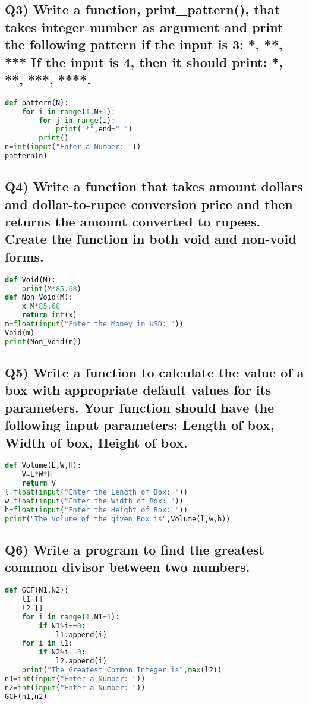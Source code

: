 \documentclass{article}
\begin{document}
\subsection*{Q3) Write a function, print\_pattern(), that takes integer number as argument and print the following pattern if the input is 3: *, **, *** If the input is 4, then it should print: *, **, ***, ****.}
\begin{lstlisting}[language=Python]
def pattern(N):
    for i in range(1,N+1):
        for j in range(i):
            print("*",end=" ")
        print()
n=int(input("Enter a Number: "))
pattern(n)
\end{lstlisting}

\subsection*{Q4) Write a function that takes amount dollars and dollar-to-rupee conversion price and then returns the amount converted to rupees. Create the function in both void and non-void forms.}
\begin{lstlisting}[language=Python]
def Void(M):
    print(M*85.68)
def Non_Void(M):
    x=M*85.68
    return int(x)
m=float(input("Enter the Money in USD: "))
Void(m)
print(Non_Void(m))
\end{lstlisting}

\subsection*{Q5) Write a function to calculate the value of a box with appropriate default values for its parameters. Your function should have the following input parameters: Length of box, Width of box, Height of box.}
\begin{lstlisting}[language=Python]
def Volume(L,W,H):
    V=L*W*H
    return V
l=float(input("Enter the Length of Box: "))
w=float(input("Enter the Width of Box: "))
h=float(input("Enter the Height of Box: "))
print("The Volume of the given Box is",Volume(l,w,h))
\end{lstlisting}

\subsection*{Q6) Write a program to find the greatest common divisor between two numbers.}
\begin{lstlisting}[language=Python]
def GCF(N1,N2):
    l1=[]
    l2=[]
    for i in range(1,N1+1):
        if N1%i==0:
            l1.append(i)
    for i in l1:
        if N2%i==0:
            l2.append(i)
    print("The Greatest Common Integer is",max(l2))
n1=int(input("Enter a Number: "))
n2=int(input("Enter a Number: "))
GCF(n1,n2)
\end{lstlisting}
\end{document}
